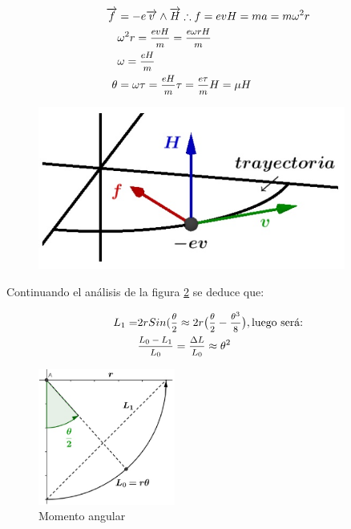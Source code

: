 \begin{figure}[H]
  \begin{minipage}[b]{0.47\textwidth}
\begin{equation*}
\begin{split}
	\overrightarrow{f} & = -e\overrightarrow{v} \wedge \overrightarrow{H}  \therefore f= evH = ma = m\omega^{2}r \\
	 & \omega^{2}r = \mfrac{evH}{m}	 = \mfrac{e\omega r H}{m} \\
	 & \omega = \mfrac{eH}{m} \\
	\theta & = \omega\tau= \mfrac{eH}{m}\tau=\mfrac{e\tau}{m} H	 = \mu H 
\end{split}
\end{equation*}  
  \vspace{0.0cm}
  \end{minipage}
  \hfill
  \begin{minipage}[b]{0.47\textwidth}
     \includegraphics[width=0.9\textwidth]{./Figures/fig319}
	\label{fig:319}
	  \vspace{0.0cm}
  \end{minipage}
\end{figure}

Continuando el análisis de la figura \ref{fig:320} se deduce que:

\begin{equation*}
\begin{split}
	L_{1}= & 2rSin(\mfrac{\theta}{2} \approx 2r\big( \mfrac{\theta}{2} -\mfrac{\theta^{3}}{8} \big), \text{luego será:} \\ 	
	 & \mfrac{L_{0}-L_{1}}{L_{0}}=\mfrac{\Delta L}{L_{0}} \approx \theta^{2}	
\end{split}
\end{equation*}  

\begin{figure}[H]
    \centering
    \includegraphics[width=0.4\textwidth]{./Figures/fig320}
	\caption{Momento angular}
	\label{fig:320}
\end{figure}

